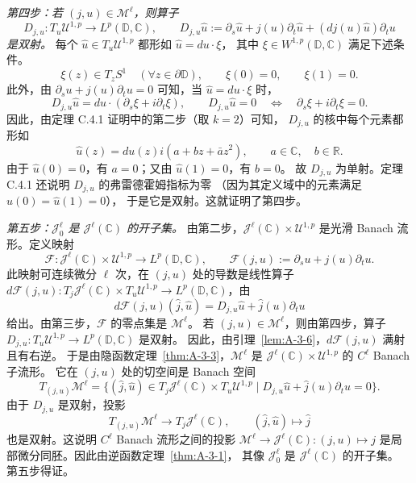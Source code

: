 \emph{第四步：若 $(j,u)\in\mathcal M^\ell$，则算子}
\[
  D_{j,u}:T_u\mathcal U^{1,p}\to L^p(\mathbb D,\mathbb C),
  \qquad
  D_{j,u}\hat u:=\partial_s\hat u+j(u)\partial_t\hat u
               +(dj(u)\hat u)\partial_tu
\]
\emph{是双射。}
每个 $\hat u\in T_u\mathcal U^{1,p}$ 都形如 $\hat u=du\cdot\xi$，
其中 $\xi\in W^{1,p}(\mathbb D,\mathbb C)$ 满足下述条件。
\[
  \xi(z)\in T_zS^1\quad(\forall z\in\partial\mathbb D),
  \qquad \xi(0)=0,\qquad\xi(1)=0.
\]
此外，由 $\partial_su+j(u)\partial_tu=0$ 可知，当 $\hat u=du\cdot\xi$ 时，
\[
  D_{j,u}\hat u=du\cdot(\partial_s\xi+i\partial_t\xi),
  \qquad
  D_{j,u}\hat u=0\quad\Longleftrightarrow\quad
  \partial_s\xi+i\partial_t\xi=0.
\]
因此，由定理 C.4.1 证明中的第二步（取 $k=2$）可知，
$D_{j,u}$ 的核中每个元素都形如
\[
  \hat u(z)=du(z)i(a+bz+\bar a z^2),
  \qquad a\in\mathbb C,\quad b\in\mathbb R.
\]
由于 $\hat u(0)=0$，有 $a=0$；又由 $\hat u(1)=0$，有 $b=0$。
故 $D_{j,u}$ 为单射。定理 C.4.1 还说明 $D_{j,u}$ 的弗雷德霍姆指标为零
（因为其定义域中的元素满足 $\hat u(0)=\hat u(1)=0$），
于是它是双射。这就证明了第四步。

\emph{第五步：$\mathcal J^\ell_0$ 是 $\mathcal J^\ell(\mathbb C)$ 的开子集。}
由第二步，$\mathcal J^\ell(\mathbb C)\times\mathcal U^{1,p}$ 是光滑
Banach 流形。定义映射
\[
  \mathcal F:\mathcal J^\ell(\mathbb C)\times\mathcal U^{1,p}
  \longrightarrow L^p(\mathbb D,\mathbb C),\qquad
  \mathcal F(j,u):=\partial_su+j(u)\partial_tu.
\]
此映射可连续微分 $\ell$ 次，在 $(j,u)$ 处的导数是线性算子
$d\mathcal F(j,u):T_j\mathcal J^\ell(\mathbb C)\times
T_u\mathcal U^{1,p}\to L^p(\mathbb D,\mathbb C)$，由
\[
  d\mathcal F(j,u)(\hat j,\hat u)
    =D_{j,u}\hat u+\hat j(u)\partial_tu
\]
给出。由第三步，$\mathcal F$ 的零点集是 $\mathcal M^\ell$。
若 $(j,u)\in\mathcal M^\ell$，则由第四步，算子
$D_{j,u}:T_u\mathcal U^{1,p}\to L^p(\mathbb D,\mathbb C)$ 是双射。
因此，由引理~\ref{lem:A-3-6}，$d\mathcal F(j,u)$ 满射且有右逆。
于是由隐函数定理~\ref{thm:A-3-3}，$\mathcal M^\ell$ 是
$\mathcal J^\ell(\mathbb C)\times\mathcal U^{1,p}$ 的 $C^\ell$ Banach 子流形。
它在 $(j,u)$ 处的切空间是 Banach 空间
\[
  T_{(j,u)}\mathcal M^\ell
   =\{(\hat j,\hat u)\in T_j\mathcal J^\ell(\mathbb C)
       \times T_u\mathcal U^{1,p}\mid
       D_{j,u}\hat u+\hat j(u)\partial_tu=0\}.
\]
由于 $D_{j,u}$ 是双射，投影
\[
  T_{(j,u)}\mathcal M^\ell\to T_j\mathcal J^\ell(\mathbb C),
  \qquad (\hat j,\hat u)\mapsto\hat j
\]
也是双射。这说明 $C^\ell$ Banach 流形之间的投影
$\mathcal M^\ell\to\mathcal J^\ell(\mathbb C):(j,u)\mapsto j$
是局部微分同胚。因此由逆函数定理~\ref{thm:A-3-1}，
其像 $\mathcal J^\ell_0$ 是 $\mathcal J^\ell(\mathbb C)$ 的开子集。
第五步得证。

